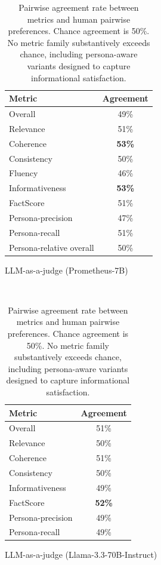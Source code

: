\begin{table}[h!]
\begin{subtable}[t]{0.55\textwidth}
\begin{tabular}{lc}
\toprule
\textbf{Metric} & \textbf{Agreement} \\
\midrule
Overall                  & 49\% \\
Relevance                & 51\% \\
Coherence                & \textbf{53\%} \\
Consistency              & 50\% \\
Fluency                  & 46\% \\
Informativeness          & \textbf{53\%} \\
FactScore                & 51\% \\
Persona-precision        & 47\% \\
Persona-recall           & 51\% \\
Persona-relative overall & 50\% \\
\bottomrule
\end{tabular}
\caption{LLM-as-a-judge (Prometheus-7B)}
\end{subtable}
\vspace{1em} \\
\begin{subtable}[t]{0.55\textwidth}
\centering
\begin{tabular}{lc}
\toprule
\textbf{Metric} & \textbf{Agreement} \\
\midrule
Overall            & 51\% \\
Relevance          & 50\% \\
Coherence          & 51\% \\
Consistency        & 50\% \\
Informativeness    & 49\% \\
FactScore          & \textbf{52\%} \\
Persona-precision  & 49\% \\
Persona-recall     & 49\% \\
\bottomrule
\end{tabular}
\caption{LLM-as-a-judge (Llama-3.3-70B-Instruct)}
\end{subtable}
\caption{Pairwise agreement rate between metrics and human pairwise preferences. Chance agreement is 50\%. No metric family substantively exceeds chance, including persona-aware variants designed to capture informational satisfaction.}
\label{tab:metric-agreement}
\end{table}